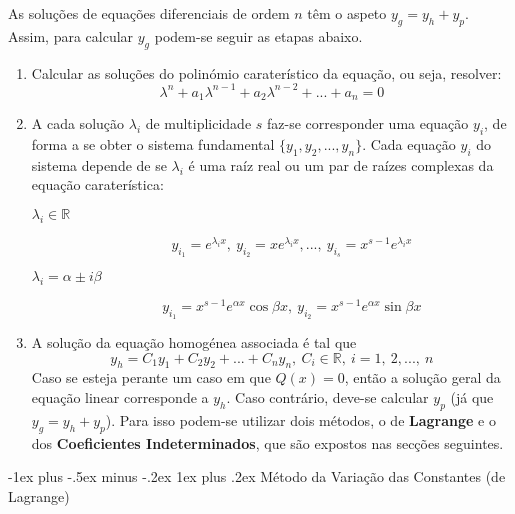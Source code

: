 \documentclass[10pt,landscape]{article}
\makeatletter
\newcommand{\RNum}[1]{\uppercase\expandafter{\romannumeral #1\relax}}
\renewcommand{\subsubsection}{\@startsection{subsubsection}{3}{0mm}%
                                {-1ex plus -.5ex minus -.2ex}%
                                {1ex plus .2ex}%
                                {\normalfont\small\bfseries}}
\makeatother
\begin{document}
\begin{multicols}{3}
As soluções de equações diferenciais de ordem $n$ têm o aspeto $y_g = y_h + y_p$. Assim, para calcular $y_g$ podem-se seguir as etapas abaixo.
\begin{enumerate}
\item Calcular as soluções do polinómio caraterístico da equação, ou seja, resolver:
$$\lambda^n + a_1 \lambda^{n-1} + a_2 \lambda^{n-2} + ... + a_n = 0$$
\item A cada solução $\lambda_i$ de multiplicidade $s$ faz-se corresponder uma equação $y_i$, de forma a se obter o sistema fundamental $\{y_1, y_2, ..., y_n\}$. Cada equação $y_i$ do sistema depende de se $\lambda_i$ é uma raíz real ou um par de raízes complexas da equação caraterística:
\begin{description}
\item[$\lambda_i \in \mathbb{R}$]
$$y_{i_1} = e^{\lambda_i x},\ y_{i_2} = x e^{\lambda_i x}, ...,\ y_{i_s} = x^{s-1} e^{\lambda_i x}$$
\item[$\lambda_i = \alpha \pm i \beta$]
$$y_{i_1} = x^{s-1} e^{\alpha x} \cos{\beta x},\ y_{i_2} = x^{s-1} e^{\alpha x} \sin{\beta x}$$
\end{description}
\item A solução da equação homogénea associada é tal que
$$y_h = C_1 y_1 + C_2 y_2 + ... + C_n y_n,\ C_i \in \mathbb{R},\ i = 1,\ 2, ...,\ n$$
Caso se esteja perante um caso em que $Q(x) = 0$, então a solução geral da equação linear corresponde a $y_h$. Caso contrário, deve-se calcular $y_p$ (já que $y_g = y_h + y_p$). Para isso podem-se utilizar dois métodos, o de \textbf{Lagrange} e o dos \textbf{Coeficientes Indeterminados}, que são expostos nas secções seguintes.
\end{enumerate}

\subsubsection{\texorpdfstring{\RNum{1}}{TEXT} Método da Variação das Constantes (de Lagrange)}


\end{multicols}
\end{document}
